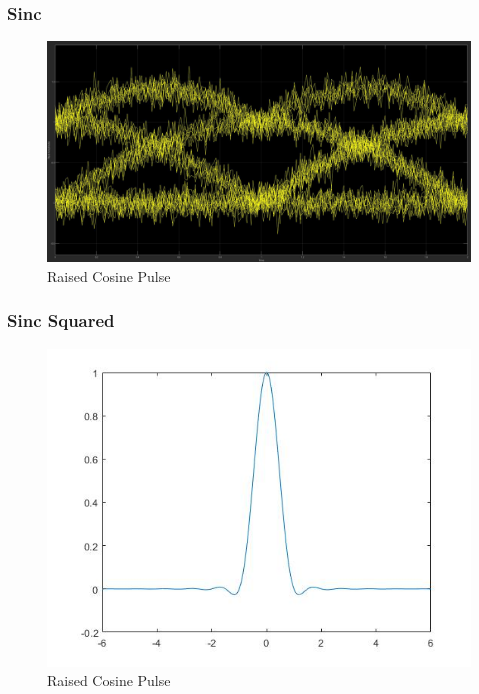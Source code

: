 \documentclass{article}
\begin{document}
\subsubsection{Sinc}
\begin{figure}[H]
  \begin{center}
    \includegraphics[width = \linewidth]{On_Off_Sin_Eye.jpg}
    \caption{Raised Cosine Pulse}
    \label{fig:Sinc-Pulse}
  \end{center}
\end{figure}
\subsubsection{Sinc Squared}
\begin{figure}[H]
  \begin{center}
    \includegraphics[width = \linewidth]{Raised_Cosine_Pulse.jpg}
    \caption{Raised Cosine Pulse}
    \label{fig:Sinc-Squared}
  \end{center}
\end{figure}
\end{document}
